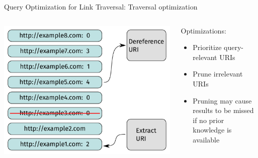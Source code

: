 \begin{frame}{Query Optimization for Link Traversal: Traversal optimization}
    \begin{columns}[T] %
        \begin{column}{0.6\textwidth} %
            \includegraphics[width=.80\linewidth]{images/link-queue-optimized.pdf} %
        \end{column}

        \begin{column}{0.4\textwidth}
            Optimizations:
            \begin{itemize}
                \item Prioritize query-relevant URIs
                \item Prune irrelevant URIs
                \item Pruning may cause results to be missed if no prior knowledge is available
            \end{itemize}
        \end{column}
    \end{columns}
\end{frame}

